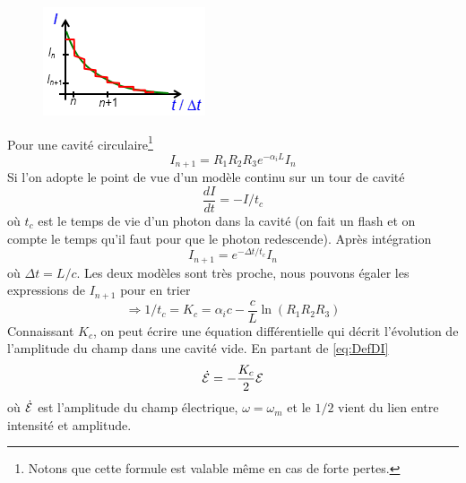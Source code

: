 	\begin{figure}
	\vspace{-20mm}
	\includegraphics[scale=0.8]{ch3/image4.png}
	\end{figure}
Pour une cavité circulaire\footnote{Notons que cette formule est valable même en cas de forte pertes.}
\begin{equation}
{I_{n + 1}} = {R_1}{R_2}{R_3}{e^{ - {\alpha _i}L}}{I_n}
\end{equation}
Si l'on adopte le point de vue d'un modèle continu sur un tour de cavité
\begin{equation}
\frac{{dI}}{{dt}} =  - I/{t_c}
\label{eq:DefDI}
\end{equation}
où $t_c$ est le temps de vie d'un photon dans la cavité (on fait un flash et on compte le temps 
qu'il faut pour que le photon redescende). Après intégration
\begin{equation}
{I_{n + 1}} = {e^{ - \Delta t/{t_c}}}{I_n}
\end{equation}
où $\Delta t= L/c$. Les deux modèles sont très proche, nous pouvons égaler les expressions de 
${I_{n + 1}}$ pour en trier
\begin{equation}
 \Rightarrow 1/{t_c} = {K_c} = {\alpha _i}c - \frac{c}{L}\ln ({R_1}{R_2}{R_3})
\end{equation}
Connaissant $K_c$, on peut écrire une équation différentielle qui décrit l'évolution de 
l'amplitude du champ dans une cavité vide. En partant de \eqref{eq:DefDI} 
\begin{equation}
{\dot {\cal E}} =  - \frac{{{K_c}}}{2}{{\cal E}}
\label{eq:CalE}
\end{equation}
où ${\dot {\cal E}}$ est l'amplitude du champ électrique, $\omega=\omega_m$ et le $1/2$ 
vient du lien entre intensité et amplitude.\\


